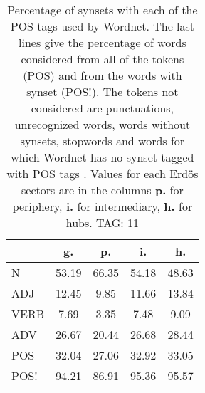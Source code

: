 \begin{table}[h!]
\begin{center}
\begin{tabular}{| l | c | c | c | c |}\hline
 & g. & p. & i. & h. \\\hline
N & 53.19  & 66.35  & 54.18  & 48.63 \\\hline
ADJ & 12.45  & 9.85  & 11.66  & 13.84 \\\hline
VERB & 7.69  & 3.35  & 7.48  & 9.09 \\\hline
ADV & 26.67  & 20.44  & 26.68  & 28.44 \\\hline
POS & 32.04  & 27.06  & 32.92  & 33.05 \\\hline
POS! & 94.21  & 86.91  & 95.36  & 95.57 \\\hline
\end{tabular}
\caption{Percentage of synsets with each of the POS tags used by Wordnet. The last lines give the percentage of words considered from all of the tokens (POS) and from the words with synset (POS!). The tokens not considered are punctuations, unrecognized words, words without synsets, stopwords and words for which Wordnet has no synset  tagged with POS tags . Values for each Erd\"os sectors are in the columns {{\bf p.}} for periphery, {{\bf i.}} for intermediary, {{\bf h.}} for hubs. TAG: 11}
\end{center}
\end{table}
